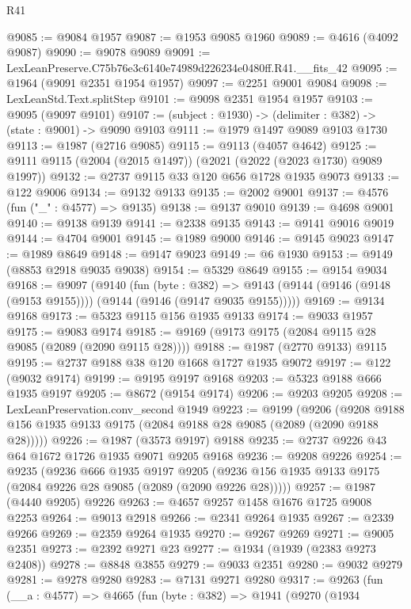 \begin{lexlean}{R41}
\begin{coremodule}
@9085 := @9084 @1957
@9087 := @1953 @9085 @1960
@9089 := @4616 (@4092 @9087)
@9090 := @9078 @9089
@9091 := LexLeanPreserve.C75b76e3c6140e74989d226234e0480ff.R41.__fits_42
@9095 := @1964 (@9091 @2351 @1954 @1957)
@9097 := @2251 @9001 @9084
@9098 := LexLeanStd.Text.splitStep
@9101 := @9098 @2351 @1954 @1957
@9103 := @9095 (@9097 @9101)
@9107 := (subject : @1930) -> (delimiter : @382) -> (state : @9001) -> @9090 @9103
@9111 := @1979 @1497 @9089 @9103 @1730
@9113 := @1987 (@2716 @9085)
@9115 := @9113 (@4057 @4642)
@9125 := @9111 @9115 (@2004 (@2015 @1497)) (@2021 (@2022 (@2023 @1730) @9089 @1997))
@9132 := @2737 @9115 @33 @120 @656 @1728 @1935 @9073
@9133 := @122 @9006
@9134 := @9132 @9133
@9135 := @2002 @9001
@9137 := @4576 (fun ("_" : @4577) => @9135)
@9138 := @9137 @9010
@9139 := @4698 @9001
@9140 := @9138 @9139
@9141 := @2338 @9135
@9143 := @9141 @9016 @9019
@9144 := @4704 @9001
@9145 := @1989 @9000
@9146 := @9145 @9023
@9147 := @1989 @8649
@9148 := @9147 @9023
@9149 := @6 @1930
@9153 := @9149 (@8853 @2918 @9035 @9038)
@9154 := @5329 @8649
@9155 := @9154 @9034
@9168 := @9097
    (@9140
      (fun (byte : @382) =>
      @9143 (@9144 (@9146 (@9148 (@9153 @9155)))) (@9144 (@9146 (@9147 @9035 @9155)))))
@9169 := @9134 @9168
@9173 := @5323 @9115 @156 @1935 @9133
@9174 := @9033 @1957
@9175 := @9083 @9174
@9185 := @9169 (@9173 @9175 (@2084 @9115 @28 @9085 (@2089 (@2090 @9115 @28))))
@9188 := @1987 (@2770 @9133) @9115
@9195 := @2737 @9188 @38 @120 @1668 @1727 @1935 @9072
@9197 := @122 (@9032 @9174)
@9199 := @9195 @9197 @9168
@9203 := @5323 @9188 @666 @1935 @9197
@9205 := @8672 (@9154 @9174)
@9206 := @9203 @9205
@9208 := LexLeanPreservation.conv_second @1949
@9223 := @9199
    (@9206 (@9208 @9188 @156 @1935 @9133 @9175 (@2084 @9188 @28 @9085 (@2089 (@2090 @9188 @28)))))
@9226 := @1987 (@3573 @9197) @9188
@9235 := @2737 @9226 @43 @64 @1672 @1726 @1935 @9071 @9205 @9168
@9236 := @9208 @9226
@9254 := @9235
    (@9236
      @666
      @1935
      @9197
      @9205
      (@9236 @156 @1935 @9133 @9175 (@2084 @9226 @28 @9085 (@2089 (@2090 @9226 @28)))))
@9257 := @1987 (@4440 @9205) @9226
@9263 := @4657 @9257 @1458 @1676 @1725 @9008 @2253
@9264 := @9013 @2918
@9266 := @2341 @9264 @1935
@9267 := @2339 @9266
@9269 := @2359 @9264 @1935
@9270 := @9267 @9269
@9271 := @9005 @2351
@9273 := @2392 @9271 @23
@9277 := @1934 (@1939 (@2383 @9273 @2408))
@9278 := @8848 @3855
@9279 := @9033 @2351
@9280 := @9032 @9279
@9281 := @9278 @9280
@9283 := @7131 @9271 @9280
@9317 := @9263
    (fun (__a : @4577) =>
    @4665
      (fun (byte : @382) =>
      @1941
        (@9270
          (@1934

\end{coremodule}
\end{lexlean}
